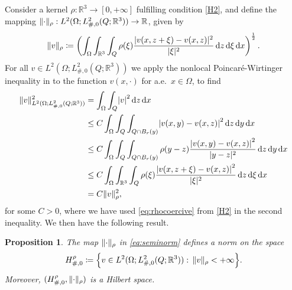 \documentclass[reqno,11pt]{amsart}
\numberwithin{equation}{section}
\theoremstyle{thmlemcorr}
\numberwithin{theorem}{section}
\newtheorem{proposition}[theorem]{Proposition}
\theoremstyle{thmlemcorr*}
\theoremstyle{defi}
\theoremstyle{remexample}
\theoremstyle{ass}
\newcommand{\R}{\mathbb{R}}
\newcommand{\dd}{\,\mathrm{d}}
\DeclarePairedDelimiter{\abs}{\lvert}{\rvert}
\DeclarePairedDelimiter{\norm}{\lVert}{\rVert}
\newcommand{\1}{\mathds{1}}
\newcommand{\Om}{\Omega}
\newcommand{\dl}{\,\mathrm{d}}
\begin{document}
Consider a kernel $\rho: \R^3 \to [0,+\infty]$ fulfilling condition \ref{H2}, and
define the mapping \(\norm{\cdot}_\rho:L^2(\Om;L^2_{\#,0}(Q;\R^3))\to \R\), given by
\begin{equation}\label{eq:seminorm}
    \norm{v}_\rho
    \coloneqq \left(\int_{\Om}\int_{\R^3}\int_Q \rho(\xi)\frac{|v(x,z+\xi)-v(x,z)|^2}{|\xi|^2} {\dl z\dl \xi\dl x}\right)^\frac{1}{2}.
\end{equation}
For all \(v\in L^2(\Om;L^2_{\#,0}(Q;\R^3))\) we apply the nonlocal Poincar\'{e}-Wirtinger inequality in \cite[Proposition~4.2]{BeM14} to the function $v(x,\cdot)$ for a.e.~$x \in \Omega$, to find 
    \begin{align}
    \begin{split}\label{eq:nonlocal_poincare}
        \norm{v}^2_{L^2(\Om;L^2_{\#,0}(Q;\R^3))}
    &=\int_\Om\int_Q\abs*{v}^2\dd z\dd x \\
    &\leq C \int_\Om\int_Q\int_{Q\cap B_r(y)}\abs*{v(x,y)-v(x,z)}^2\dd z\dd y\dd x \\
    &\leq C \int_\Om\int_Q\int_{Q\cap B_r(y)}\rho(y-z)\frac{\abs*{v(x,y)-v(x,z)}^2}{\abs{y-z}^2}\dd z\dd y\dd x \\
    &\leq C \int_\Om\int_{\R^3}\int_Q\rho(\xi)\frac{\abs*{v(x,z+\xi)-v(x,z)}^2}{\abs{\xi}^2}\dd z\dd \xi\dd x\\
    &= C\norm{v}_\rho^2,
    \end{split}
    \end{align}
for some $C > 0$, where we have used \eqref{eq:rhocoercive} from \ref{H2} in the second inequality. We then have the following result.
\begin{proposition}\label{prop:hilbert_space}
 The map \(\norm{\cdot}_\rho\) in \eqref{eq:seminorm} defines a norm on the space 
\begin{equation*}
    H^\rho_{\#,0}\coloneqq \Big\{v\in L^2(\Om;L^2_{\#,0}(Q;\R^3)):\, 
    \norm{v}_\rho<+ \infty\Big\}.
\end{equation*}
Moreover, \((H^\rho_{\#,0},\norm{\cdot}_\rho) \) is a Hilbert space.
\end{proposition}
\end{document}
